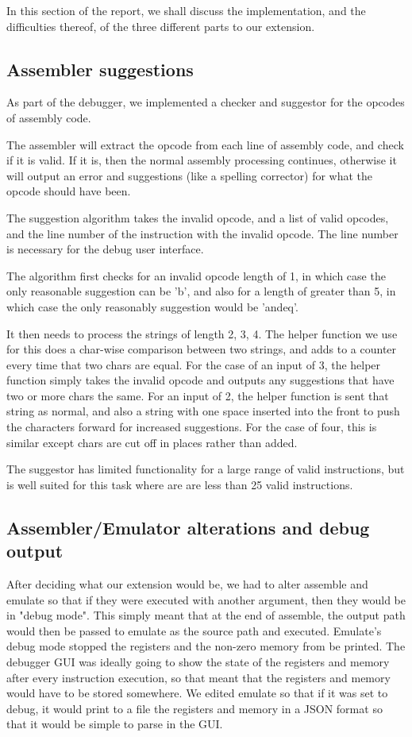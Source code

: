 \documentclass[11pt]{article}
\begin{document}
In this section of the report, we shall discuss the implementation, and the difficulties thereof, of the three different parts to our extension.

\subsection{Assembler suggestions}
As part of the debugger, we implemented a checker and suggestor for the opcodes of assembly code.

The assembler will extract the opcode from each line of assembly code, and check if it is valid. If it is, then the normal assembly processing continues, otherwise it will output an error and suggestions (like a spelling corrector) for what the opcode should have been.

The suggestion algorithm takes the invalid opcode, and a list of valid opcodes, and the line number of the instruction with the invalid opcode. The line number is necessary for the debug user interface.

The algorithm first checks for an invalid opcode length of 1, in which case the only reasonable suggestion can be 'b', and also for a length of greater than 5, in which case the only reasonably suggestion would be 'andeq'.

It then needs to process the strings of length 2, 3, 4. The helper function we use for this does a char-wise comparison between two strings, and adds to a counter every time that two chars are equal. For the case of an input of 3, the helper function simply takes the invalid opcode and outputs any suggestions that have two or more chars the same. For an input of 2, the helper function is sent that string as normal, and also a string with one space inserted into the front to push the characters forward for increased suggestions. For the case of four, this is similar except chars are cut off in places rather than added.

The suggestor has limited functionality for a large range of valid instructions, but is well suited for this task where are are less than 25 valid instructions.

\subsection{Assembler/Emulator alterations and debug output}
After deciding what our extension would be, we had to alter assemble and emulate so that if they were executed with another argument, then they would be in "debug mode". This simply meant that at the end of assemble, the output path would then be passed to emulate as the source path and executed. Emulate's debug mode stopped the registers and the non-zero memory from be printed. The debugger GUI was ideally going to show the state of the registers and memory after every instruction execution, so that meant that the registers and memory would have to be stored somewhere. We edited emulate so that if it was set to debug, it would print to a file the registers and memory in a JSON format so that it would be simple to parse in the GUI.
\end{document}
